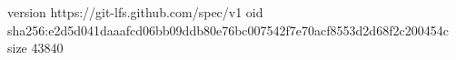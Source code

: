 version https://git-lfs.github.com/spec/v1
oid sha256:e2d5d041daaafcd06bb09ddb80e76bc007542f7e70acf8553d2d68f2c200454c
size 43840
